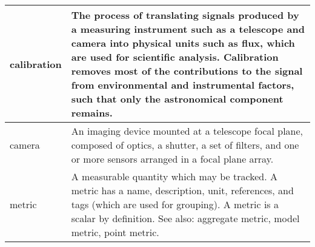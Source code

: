 \begin{longtable}{|l|p{}|}
calibration & The process of translating signals produced by a measuring instrument such as a telescope and camera into physical units such as flux, which are used for scientific analysis. Calibration removes most of the contributions to the signal from environmental and instrumental factors, such that only the astronomical component remains. \\\hline
camera & An imaging device mounted at a telescope focal plane, composed of optics, a shutter, a set of filters, and one or more sensors arranged in a focal plane array. \\\hline
metric & A measurable quantity which may be tracked. A metric has a name, description, unit, references, and tags (which are used for grouping). A metric is a scalar by definition. See also: aggregate metric, model metric, point metric. \\\hline
\end{longtable}

